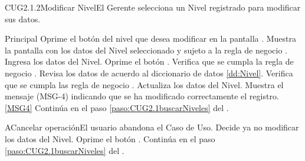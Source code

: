 	\begin{UseCase}{CUG2.1.2}{Modificar Nivel}{El Gerente selecciona un Nivel registrado para modificar sus datos.}
	\end{UseCase}

	\begin{UCtrayectoria}{Principal}			
			\UCpaso[\UCactor] Oprime el botón  del nivel que desea modificar en la pantalla .	
			\UCpaso Muestra la pantalla  con los datos del Nivel seleccionado y sujeto a la regla de negocio .
                        \UCpaso [\UCactor] Ingresa los datos del Nivel.\label{paso:CUG2.1.2ingresaDatosNivel}
			\UCpaso [\UCactor] Oprime el botón .
			\UCpaso Verifica que se cumpla la regla de negocio .  
			\UCpaso Revisa los datos de acuerdo al diccionario de datos \ref{dd:Nivel}. 
			\UCpaso Verifica que se cumpla las regla de negocio  .  
			\UCpaso Actualiza los datos del Nivel.
			\UCpaso Muestra el mensaje (MSG-4) indicando que se ha modificado correctamente el registro.\ref{MSG4}
			\UCpaso Continúa en el paso \ref{paso:CUG2.1buscarNiveles} del .
	\end{UCtrayectoria}

		\begin{UCtrayectoriaA}{A}{Cancelar operación}{El usuario abandona el Caso de Uso.}
			\UCpaso[\UCactor] Decide ya no modificar los datos del Nivel.
			\UCpaso[\UCactor] Oprime el botón .
			\UCpaso Continúa en el paso \ref{paso:CUG2.1buscarNiveles} del .
		\end{UCtrayectoriaA}

